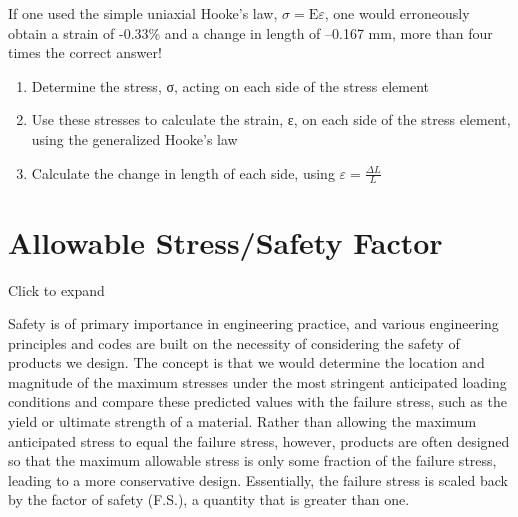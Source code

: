 \documentclass[
  letterpaper,
  DIV=11,
  numbers=noendperiod]{scrreprt}
\providecommand{\tightlist}{%
  \setlength{\itemsep}{0pt}\setlength{\parskip}{0pt}}\usepackage{longtable,booktabs,array}
\theoremstyle{definition}
\theoremstyle{remark}
\begin{document}
\begin{tcolorbox}
\begin{tcolorbox}
If one used the simple uniaxial Hooke's law,
\(\sigma=\mathrm{E} \varepsilon\), one would erroneously obtain a strain
of -0.33\% and a change in length of --0.167 mm, more than four times
the correct answer!

\end{tcolorbox}

\end{tcolorbox}

\begin{tcolorbox}[enhanced jigsaw, leftrule=.75mm, colbacktitle=quarto-callout-warning-color!10!white, breakable, opacityback=0, colback=white, titlerule=0mm, toprule=.15mm, colframe=quarto-callout-warning-color-frame, coltitle=black, title={Step-by-step: Multiaxial Hooke's Law}, toptitle=1mm, bottomrule=.15mm, rightrule=.15mm, left=2mm, arc=.35mm, opacitybacktitle=0.6, bottomtitle=1mm]

\begin{enumerate}
\def\labelenumi{\arabic{enumi}.}
\tightlist
\item
  Determine the stress, σ, acting on each side of the stress element
\item
  Use these stresses to calculate the strain, ε, on each side of the
  stress element, using the generalized Hooke's law
\item
  Calculate the change in length of each side, using
  \(\varepsilon=\frac{\Delta L}{L}\)
\end{enumerate}

\end{tcolorbox}

\section{Allowable Stress/Safety Factor}\label{sec-4.8}

Click to expand

Safety is of primary importance in engineering practice, and various
engineering principles and codes are built on the necessity of
considering the safety of products we design. The concept is that we
would determine the location and magnitude of the maximum stresses under
the most stringent anticipated loading conditions and compare these
predicted values with the failure stress, such as the yield or ultimate
strength of a material. Rather than allowing the maximum anticipated
stress to equal the failure stress, however, products are often designed
so that the maximum allowable stress is only some fraction of the
failure stress, leading to a more conservative design. Essentially, the
failure stress is scaled back by the factor of safety (F.S.), a quantity
that is greater than one.
\end{document}
